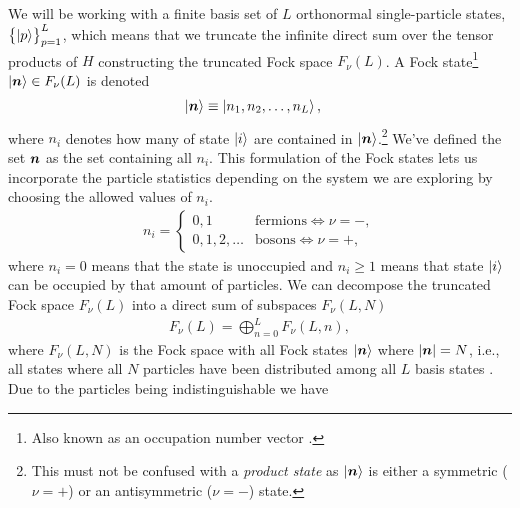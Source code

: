             We will be working with a finite basis set of $L$ orthonormal
            single-particle states, $\left\{ \ket{p} \right\}_{p = 1}^{L}$, which means
            that we truncate the infinite direct sum over the tensor products of
            $H$ constructing the truncated Fock space $F_{\nu}(L)$.
            A Fock state\footnote{%
                Also known as an occupation number vector
                \cite{helgaker-molecular}.
            } $\ket{\boldsymbol{n}} \in F_{\nu}(L)$ is denoted
            \begin{align}
                \ket{\boldsymbol{n}}
                &\equiv \ket{n_1, n_2, \dots, n_L},
            \end{align}
            where $n_i$ denotes how many of state $\ket{i}$ are contained in
            $\ket{\boldsymbol{n}}$.\footnote{%
                This must not be confused with a \emph{product state} as
                $\ket{\boldsymbol{n}}$ is either a symmetric ($\nu = +$) or an
                antisymmetric ($\nu = -$) state.%
            }
            We've defined the set $\boldsymbol{n}$ as the set containing all $n_i$.
            This formulation of the Fock states lets us incorporate the particle
            statistics depending on the system we are exploring by choosing the
            allowed values of $n_i$.
            \begin{align}
                n_i =
                \begin{cases}
                    0, 1 & \text{fermions} \iff \nu = -, \\
                    0, 1, 2, \dots & \text{bosons} \iff \nu = +,
                \end{cases}
            \end{align}
            where $n_i = 0$ means that the state is unoccupied and $n_i \geq 1$
            means that state $\ket{i}$ can be occupied by that amount of
            particles.
            We can decompose the truncated Fock space $F_{\nu}(L)$ into a direct
            sum of subspaces $F_{\nu}(L, N)$
            \begin{align}
                F_{\nu}(L)
                = \bigoplus_{n = 0}^{L}
                F_{\nu}(L, n),
            \end{align}
            where $F_{\nu}(L, N)$ is the Fock space with all Fock states
            $\ket{\boldsymbol{n}}$ where $\abs{\boldsymbol{n}} = N$, i.e., all states where
            all $N$ particles have been distributed among all $L$ basis states
            \cite{helgaker-molecular}.
            Due to the particles being indistinguishable we have
